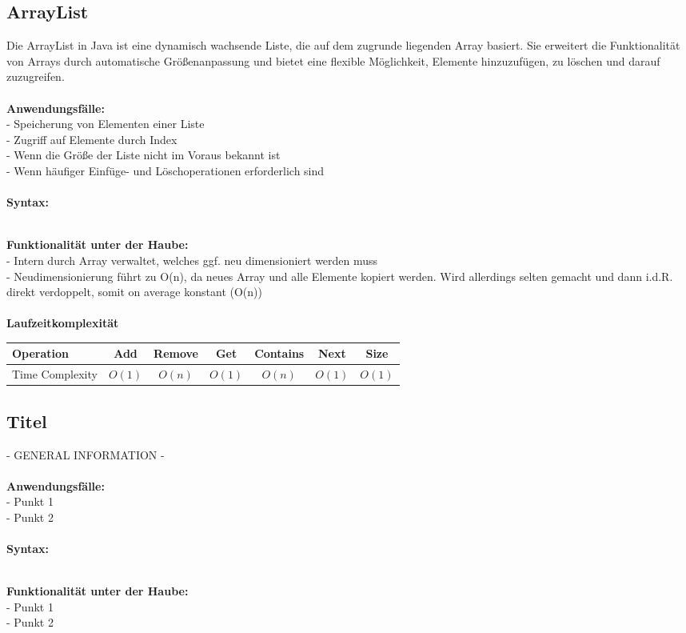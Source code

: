 \documentclass[../main.tex]{subfiles}
\begin{document}
		\subsection{ArrayList}
		Die ArrayList in Java ist eine dynamisch wachsende Liste, die auf dem zugrunde liegenden Array basiert.
		Sie erweitert die Funktionalität von Arrays durch automatische Größenanpassung und bietet eine flexible Möglichkeit, Elemente hinzuzufügen, zu löschen und darauf zuzugreifen. \\\\
		\textbf{Anwendungsfälle:}\\
		- Speicherung von Elementen einer Liste\\
		- Zugriff auf Elemente durch Index\\
		- Wenn die Größe der Liste nicht im Voraus bekannt ist\\ 
		- Wenn häufiger Einfüge- und Löschoperationen erforderlich sind\\\\
		\textbf{Syntax:}
		 
		\\
		\textbf{Funktionalität unter der Haube:}\\
		- Intern durch Array verwaltet, welches ggf. neu dimensioniert werden muss\\
		- Neudimensionierung führt zu O(n), da neues Array und alle Elemente kopiert werden. Wird allerdings selten gemacht und dann i.d.R. direkt verdoppelt, somit on average konstant (O(n))\\\\
		\textbf{Laufzeitkomplexität}\\
		\begin{table}[ht]
			\centering
			\begin{tabular}{l *{6}{c}}
				\toprule
				Operation & Add & Remove & Get & Contains & Next & Size \\
				\midrule
				Time Complexity & $O(1)$ & $O(n)$ & $O(1)$ & $O(n)$ & $O(1)$ & $O(1)$ \\
				\bottomrule
			\end{tabular}
			\label{tab:arraylist-complexities}
		\end{table}
		\clearpage
		
		\subsection{Titel}
		- GENERAL INFORMATION -\\\\
		\textbf{Anwendungsfälle:}\\
		- Punkt 1\\
		- Punkt 2\\
		\\
		\textbf{Syntax:}
		 
		\\
		\textbf{Funktionalität unter der Haube:}\\
		- Punkt 1\\
		- Punkt 2\\\\
		
		
		\clearpage
\end{document}

